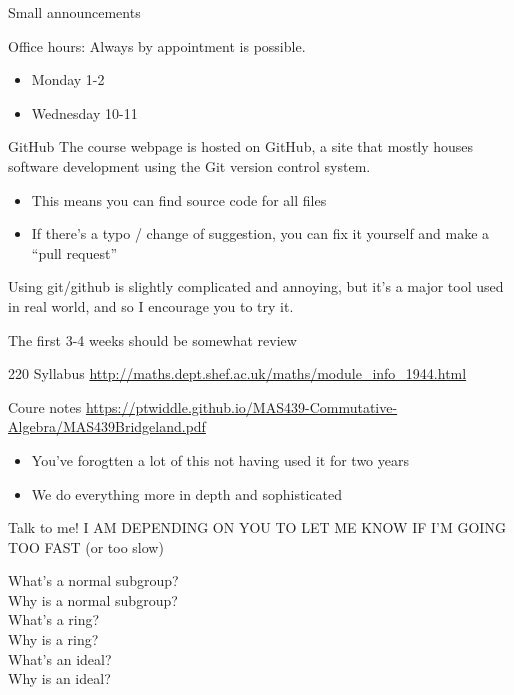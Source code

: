 \documentclass{beamer}
\begin{document}
\begin{frame}{Small announcements}
  \begin{block}{Office hours:}
Always by appointment is possible.
    \begin{itemize}
    \item Monday 1-2
    \item Wednesday 10-11
    \end{itemize}
\end{block}
    \begin{block}{GitHub}
      The course webpage is hosted on GitHub, a site that mostly houses software development using the Git version control system.
      \begin{itemize}
    \item This means you can find source code for all files
    \item If there's a typo / change of suggestion, you can fix it yourself and make a ``pull request''
    \end{itemize}
   Using git/github is slightly complicated and annoying, but it's a major tool used in real world, and so I encourage you to try it.
           \end{block}
\end{frame}

\begin{frame}{The first 3-4 weeks should be somewhat review}

\begin{block}{220 Syllabus}
  \url{http://maths.dept.shef.ac.uk/maths/module_info_1944.html}
\end{block}

\begin{block}{Coure notes}
  \url{https://ptwiddle.github.io/MAS439-Commutative-Algebra/MAS439Bridgeland.pdf}
  \end{block}
    
\begin{itemize}
\item You've forogtten a lot of this not having used it for two years
\item We do everything more in depth and sophisticated
\end{itemize}
\begin{block}{Talk to me!}
\alert{I AM DEPENDING ON YOU TO LET ME KNOW IF I'M GOING TOO FAST} (or too slow)
\end{block}
\end{frame}


\begin{frame}[plain,c]

\begin{center}

\Huge

What's a normal subgroup?  \\ Why is a normal subgroup? \\
What's a ring?  \\ Why is a ring? \\
What's an ideal? \\
Why is an ideal? 
\end{center}

\end{frame}
\end{document}
